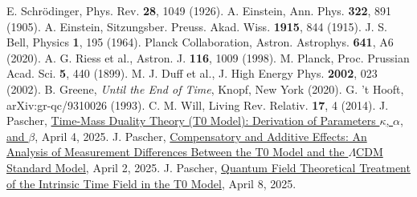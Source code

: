 \documentclass[12pt,a4paper]{article}
\begin{document}
\begin{thebibliography}{99}
		 E. Schrödinger, Phys. Rev. \textbf{28}, 1049 (1926).
		 A. Einstein, Ann. Phys. \textbf{322}, 891 (1905).
		 A. Einstein, Sitzungsber. Preuss. Akad. Wiss. \textbf{1915}, 844 (1915).
		 J. S. Bell, Physics \textbf{1}, 195 (1964).
		 Planck Collaboration, Astron. Astrophys. \textbf{641}, A6 (2020).
		 A. G. Riess et al., Astron. J. \textbf{116}, 1009 (1998).
		 M. Planck, Proc. Prussian Acad. Sci. \textbf{5}, 440 (1899).
		 M. J. Duff et al., J. High Energy Phys. \textbf{2002}, 023 (2002).
		 B. Greene, \textit{Until the End of Time}, Knopf, New York (2020).
		 G. 't Hooft, arXiv:gr-qc/9310026 (1993).
		 C. M. Will, Living Rev. Relativ. \textbf{17}, 4 (2014).
		 J. Pascher, \href{https://github.com/jpascher/T0-Time-Mass-Duality/tree/main/2/pdf/English/ZeitMasseT0ParamsEn.pdf}{Time-Mass Duality Theory (T0 Model): Derivation of Parameters \(\kappa\), \(\alpha\), and \(\beta\)}, April 4, 2025.
		 J. Pascher, \href{https://github.com/jpascher/T0-Time-Mass-Duality/tree/main/2/pdf/English/MessdifferenzenT0StandardEn.pdf}{Compensatory and Additive Effects: An Analysis of Measurement Differences Between the T0 Model and the \(\Lambda\)CDM Standard Model}, April 2, 2025.
				 J. Pascher, \href{https://github.com/jpascher/T0-Time-Mass-Duality/tree/main/2/pdf/English/QFTIntrinsischesZeitT0En.pdf}{Quantum Field Theoretical Treatment of the Intrinsic Time Field in the T0 Model}, April 8, 2025.
	\end{thebibliography}
	
\end{document}
